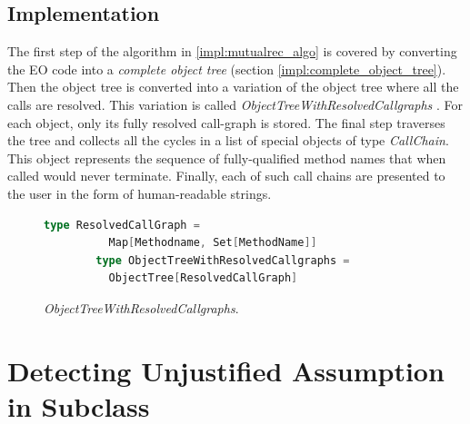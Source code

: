 \subsection{Implementation}
The first step of the algorithm in \ref{impl:mutualrec_algo} is covered by converting the EO code into a \textit{complete object tree} (section \ref{impl:complete_object_tree}). Then the object tree is converted into a variation of the object tree where all the calls are resolved. This variation is called \textit{ObjectTreeWithResolvedCallgraphs} . For each object, only its fully resolved call-graph is stored. The final step traverses the tree and collects all the cycles in a list of special objects of type \textit{CallChain}. This object represents the sequence of fully-qualified method names that when called would never terminate. Finally, each of such call chains are presented to the user in the form of human-readable strings. 

\begin{figure}
    \begin{lstlisting}[language=Scala]
        type ResolvedCallGraph = 
          Map[Methodname, Set[MethodName]]
        type ObjectTreeWithResolvedCallgraphs =
          ObjectTree[ResolvedCallGraph]
    \end{lstlisting}
    \caption{\textit{ObjectTreeWithResolvedCallgraphs}.}
    \label{fig:mutualrec_program}
\end{figure}

\section{Detecting Unjustified Assumption in Subclass}
\label{impl:unjustified}

